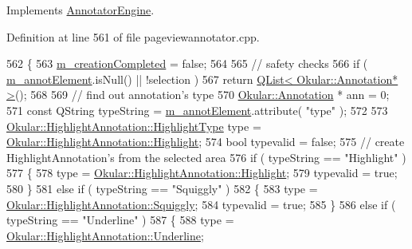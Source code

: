 Implements \hyperlink{classAnnotatorEngine_a50455740303878b891195132df27a2ab}{Annotator\+Engine}.



Definition at line 561 of file pageviewannotator.\+cpp.


\begin{DoxyCode}
562         \{
563             \hyperlink{classAnnotatorEngine_a0df119b4d87a1e3ea8ed60a96d7ff444}{m\_creationCompleted} = \textcolor{keyword}{false};
564 
565             \textcolor{comment}{// safety checks}
566             \textcolor{keywordflow}{if} ( \hyperlink{classAnnotatorEngine_ac95af6291cc2f0c601e1bbf8a5e6a0bd}{m\_annotElement}.isNull() || !selection )
567                 \textcolor{keywordflow}{return} \hyperlink{classQList}{QList< Okular::Annotation* >}();
568 
569             \textcolor{comment}{// find out annotation's type}
570             \hyperlink{classOkular_1_1Annotation}{Okular::Annotation} * ann = 0;
571             \textcolor{keyword}{const} QString typeString = \hyperlink{classAnnotatorEngine_ac95af6291cc2f0c601e1bbf8a5e6a0bd}{m\_annotElement}.attribute( \textcolor{stringliteral}{"type"} );
572 
573             \hyperlink{classOkular_1_1HighlightAnnotation_a63d2488735d1d6320e2e118743243999}{Okular::HighlightAnnotation::HighlightType} type = 
      \hyperlink{classOkular_1_1HighlightAnnotation_a63d2488735d1d6320e2e118743243999a250833fcd89a56dd46955dc287e1a3af}{Okular::HighlightAnnotation::Highlight};
574             \textcolor{keywordtype}{bool} typevalid = \textcolor{keyword}{false};
575             \textcolor{comment}{// create HighlightAnnotation's from the selected area}
576             \textcolor{keywordflow}{if} ( typeString == \textcolor{stringliteral}{"Highlight"} )
577             \{
578                 type = \hyperlink{classOkular_1_1HighlightAnnotation_a63d2488735d1d6320e2e118743243999a250833fcd89a56dd46955dc287e1a3af}{Okular::HighlightAnnotation::Highlight};
579                 typevalid = \textcolor{keyword}{true};
580             \}
581             \textcolor{keywordflow}{else} \textcolor{keywordflow}{if} ( typeString == \textcolor{stringliteral}{"Squiggly"} )
582             \{
583                 type = \hyperlink{classOkular_1_1HighlightAnnotation_a63d2488735d1d6320e2e118743243999ad02aabccfaaea6082d9402b01e6ae9b8}{Okular::HighlightAnnotation::Squiggly};
584                 typevalid = \textcolor{keyword}{true};
585             \}
586             \textcolor{keywordflow}{else} \textcolor{keywordflow}{if} ( typeString == \textcolor{stringliteral}{"Underline"} )
587             \{
588                 type = \hyperlink{classOkular_1_1HighlightAnnotation_a63d2488735d1d6320e2e118743243999a1cb762e7ebfd92add9d8b71106e3fa2c}{Okular::HighlightAnnotation::Underline};

\end{DoxyCode}
